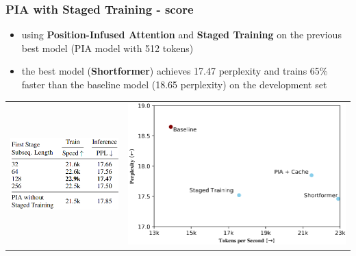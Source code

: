 \documentclass{beamer}
\begin{document}
\begin{frame}
    \frametitle{PIA with Staged Training - score}
    \begin{center}
        \begin{itemize}
            \item using \textbf{Position-Infused Attention} and \textbf{Staged Training} on the previous best model (PIA model with 512 tokens)
            \item the best model (\textbf{Shortformer}) achieves 17.47 perplexity and trains 65\% faster than the baseline model (18.65 perplexity)  on the development set
        \end{itemize}

        \begin{tabular}{ m{4cm} m{5cm} }
        \includegraphics[scale=0.30]{img/shortformer_pia_score_with_staged_train.png}
        & \includegraphics[scale=0.25]{img/shortformer_performance.png} \\
        \end{tabular}
    \end{center}
\end{frame}
\end{document}
